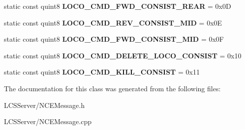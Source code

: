 \begin{DoxyCompactItemize}
static const quint8 {\bfseries L\+O\+C\+O\+\_\+\+C\+M\+D\+\_\+\+F\+W\+D\+\_\+\+C\+O\+N\+S\+I\+S\+T\+\_\+\+R\+E\+AR} = 0x0D
\item 
\mbox{\label{class_n_c_e_message_a55a0d0cf71838cbee94b9afcc6de9195}} 
static const quint8 {\bfseries L\+O\+C\+O\+\_\+\+C\+M\+D\+\_\+\+R\+E\+V\+\_\+\+C\+O\+N\+S\+I\+S\+T\+\_\+\+M\+ID} = 0x0E
\item 
\mbox{\label{class_n_c_e_message_af9d3309874e55aeaed14a66e7e5a5386}} 
static const quint8 {\bfseries L\+O\+C\+O\+\_\+\+C\+M\+D\+\_\+\+F\+W\+D\+\_\+\+C\+O\+N\+S\+I\+S\+T\+\_\+\+M\+ID} = 0x0F
\item 
\mbox{\label{class_n_c_e_message_a7ae479c7e0f82a7aff2ca7be083f4cc3}} 
static const quint8 {\bfseries L\+O\+C\+O\+\_\+\+C\+M\+D\+\_\+\+D\+E\+L\+E\+T\+E\+\_\+\+L\+O\+C\+O\+\_\+\+C\+O\+N\+S\+I\+ST} = 0x10
\item 
\mbox{\label{class_n_c_e_message_a89a165925842aa1151f0c0f0a98e6b24}} 
static const quint8 {\bfseries L\+O\+C\+O\+\_\+\+C\+M\+D\+\_\+\+K\+I\+L\+L\+\_\+\+C\+O\+N\+S\+I\+ST} = 0x11
\end{DoxyCompactItemize}


The documentation for this class was generated from the following files\+:\begin{DoxyCompactItemize}
\item 
L\+C\+S\+Server/N\+C\+E\+Message.\+h\item 
L\+C\+S\+Server/N\+C\+E\+Message.\+cpp\end{DoxyCompactItemize}
